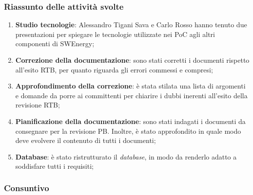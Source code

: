 \subsubsection{Riassunto delle attività svolte}
\begin{enumerate}
	\item \textbf{Studio tecnologie}: Alessandro Tigani Sava e Carlo Rosso hanno
	      tenuto due presentazioni per spiegare le tecnologie utilizzate nei PoC
	      agli altri componenti di SWEnergy;

	\item \textbf{Correzione della documentazione}: sono stati corretti i
	      documenti rispetto all'esito RTB, per quanto riguarda gli errori
	      commessi e compresi;

	\item \textbf{Approfondimento della correzione}: è stata stilata una lista
	      di argomenti e domande da porre ai committenti per chiarire i dubbi
	      inerenti all'esito della revisione RTB;

	\item \textbf{Pianificazione della documentazione}: sono stati indagati i
	      documenti da consegnare per la revisione PB. Inoltre, è stato
	      approfondito in quale modo deve evolvere il contenuto di tutti i
	      documenti;

	\item \textbf{Database}: è stato ristrutturato il \textit{database}, in modo da
	      renderlo adatto a soddisfare tutti i requisiti;
\end{enumerate}

\subsubsection{Consuntivo}

